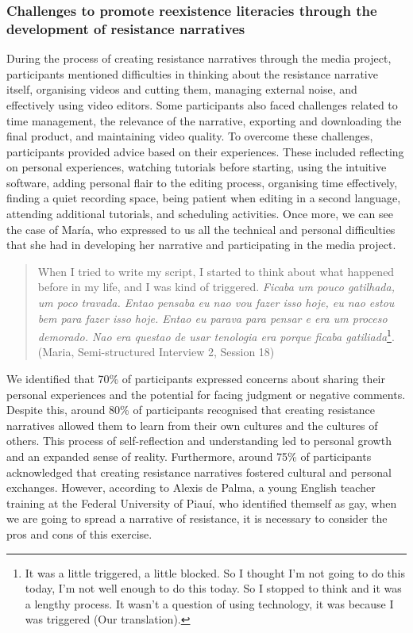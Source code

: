\documentclass[english]{textolivre}
\begin{document}
\subsubsection{Challenges to promote reexistence literacies through the development of resistance narratives}\label{sec-resumo}
During the process of creating resistance narratives through the media project, participants mentioned difficulties in thinking about the resistance narrative itself, organising videos and cutting them, managing external noise, and effectively using video editors. Some participants also faced challenges related to time management, the relevance of the narrative, exporting and downloading the final product, and maintaining video quality. To overcome these challenges, participants provided advice based on their experiences. These included reflecting on personal experiences, watching tutorials before starting, using the intuitive software, adding personal flair to the editing process, organising time effectively, finding a quiet recording space, being patient when editing in a second language, attending additional tutorials, and scheduling activities. Once more, we can see the case of María, who expressed to us all the technical and personal difficulties that she had in developing her narrative and participating in the media project.

\begin{quote}
    When I tried to write my script, I started to think about what happened before in my life, and I was kind of triggered. \textit{Ficaba um pouco gatilhada, um poco travada. Entao pensaba eu nao vou fazer isso hoje, eu nao estou bem para fazer isso hoje. Entao eu parava para pensar e era um proceso demorado. Nao era questao de usar tenologia era porque ficaba gatiliada}\footnote{It was a little triggered, a little blocked. So I thought I'm not going to do this today, I'm not well enough to do this today. So I stopped to think and it was a lengthy process. It wasn't a question of using technology, it was because I was triggered (Our translation).}. (Maria, Semi-structured Interview 2, Session 18)
\end{quote}

We identified that 70\% of participants expressed concerns about sharing their personal experiences and the potential for facing judgment or negative comments. Despite this, around 80\% of participants recognised that creating resistance narratives allowed them to learn from their own cultures and the cultures of others. This process of self-reflection and understanding led to personal growth and an expanded sense of reality. Furthermore, around 75\% of participants acknowledged that creating resistance narratives fostered cultural and personal exchanges. However, according to Alexis de Palma, a young English teacher training at the Federal University of Piauí, who identified themself as gay, when we are going to spread a narrative of resistance, it is necessary to consider the pros and cons of this exercise.
\end{document}
